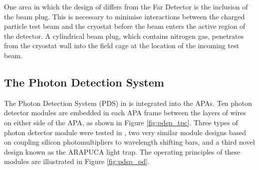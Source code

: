 One area in which the design of \protodune{} differs from the Far Detector is
the inclusion of the beam plug. This is necessary to minimise interactions
between the charged particle test beam and the cryostat before the beam enters 
the active region of the detector. A cylindrical beam plug, which contains 
nitrogen gas, penetrates from the cryostat wall into the field cage at 
the location of the incoming test beam. 

\subsection{The Photon Detection System}

The Photon Detection System (PDS) in \protodune{} is integrated into the APAs. 
Ten photon detector modules are embedded in each APA frame between the layers 
of wires on either side of the APA, as shown in Figure \ref{fig:pdsp_tpc}. 
Three types of photon detector module were tested in \protodune{}, two very 
similar module designs based on coupling silicon photomultipliers to 
wavelength shifting bars, and a third novel design known as the ARAPUCA light 
trap. The operating principles of these modules are illustrated in Figure 
\ref{fig:pdsp_pd}.

